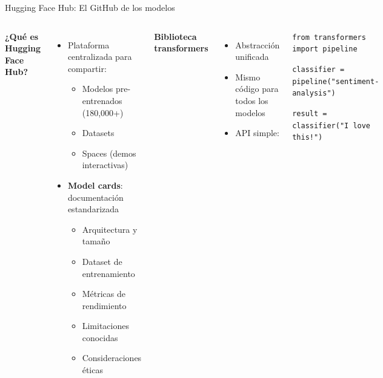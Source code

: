 \begin{frame}{Hugging Face Hub: El GitHub de los modelos}

\begin{columns}
\textbf{¿Qué es Hugging Face Hub?}
\begin{itemize}
    \item Plataforma centralizada para compartir:
    \begin{itemize}
        \item Modelos pre-entrenados (180,000+)
        \item Datasets
        \item Spaces (demos interactivas)
    \end{itemize}
    \item \textbf{Model cards}: documentación estandarizada
    \begin{itemize}
        \item Arquitectura y tamaño
        \item Dataset de entrenamiento
        \item Métricas de rendimiento
        \item Limitaciones conocidas
        \item Consideraciones éticas
    \end{itemize}
\end{itemize}

\textbf{Biblioteca transformers}
\begin{itemize}
    \item Abstracción unificada
    \item Mismo código para todos los modelos
    \item API simple:
\end{itemize}

\begin{block}{}
\tiny
\texttt{from transformers import pipeline}

\texttt{classifier = pipeline("sentiment-analysis")}

\texttt{result = classifier("I love this!")}
\end{block}

\end{columns}

\end{frame}

